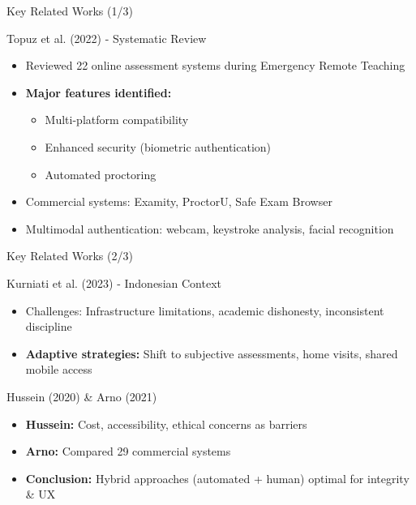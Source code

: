 \begin{frame}{Key Related Works (1/3)}
    \begin{block}{Topuz et al. (2022) - Systematic Review}
        \begin{itemize}
            \item Reviewed 22 online assessment systems during Emergency Remote Teaching
            \item \textbf{Major features identified:}
            \begin{itemize}
                \item Multi-platform compatibility
                \item Enhanced security (biometric authentication)
                \item Automated proctoring
            \end{itemize}
            \item Commercial systems: Examity, ProctorU, Safe Exam Browser
            \item Multimodal authentication: webcam, keystroke analysis, facial recognition
        \end{itemize}
    \end{block}
\end{frame}

\begin{frame}{Key Related Works (2/3)}
    \begin{block}{Kurniati et al. (2023) - Indonesian Context}
        \begin{itemize}
            \item Challenges: Infrastructure limitations, academic dishonesty, inconsistent discipline
            \item \textbf{Adaptive strategies:} Shift to subjective assessments, home visits, shared mobile access
        \end{itemize}
    \end{block}
    
    \begin{block}{Hussein (2020) \& Arno (2021)}
        \begin{itemize}
            \item \textbf{Hussein:} Cost, accessibility, ethical concerns as barriers
            \item \textbf{Arno:} Compared 29 commercial systems
            \item \textbf{Conclusion:} Hybrid approaches (automated + human) optimal for integrity \& UX
        \end{itemize}
    \end{block}
\end{frame}

